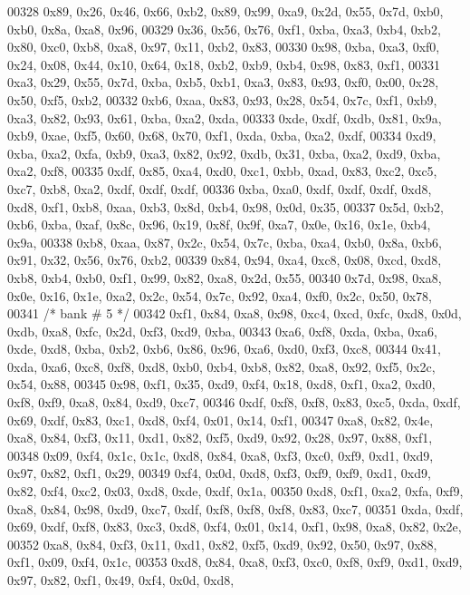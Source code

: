 \begin{DoxyCode}
00328     0x89, 0x26, 0x46, 0x66, 0xb2, 0x89, 0x99, 0xa9, 0x2d, 0x55, 0x7d, 0xb0, 0xb0, 0x8a, 0xa8, 0x96,
00329     0x36, 0x56, 0x76, 0xf1, 0xba, 0xa3, 0xb4, 0xb2, 0x80, 0xc0, 0xb8, 0xa8, 0x97, 0x11, 0xb2, 0x83,
00330     0x98, 0xba, 0xa3, 0xf0, 0x24, 0x08, 0x44, 0x10, 0x64, 0x18, 0xb2, 0xb9, 0xb4, 0x98, 0x83, 0xf1,
00331     0xa3, 0x29, 0x55, 0x7d, 0xba, 0xb5, 0xb1, 0xa3, 0x83, 0x93, 0xf0, 0x00, 0x28, 0x50, 0xf5, 0xb2,
00332     0xb6, 0xaa, 0x83, 0x93, 0x28, 0x54, 0x7c, 0xf1, 0xb9, 0xa3, 0x82, 0x93, 0x61, 0xba, 0xa2, 0xda,
00333     0xde, 0xdf, 0xdb, 0x81, 0x9a, 0xb9, 0xae, 0xf5, 0x60, 0x68, 0x70, 0xf1, 0xda, 0xba, 0xa2, 0xdf,
00334     0xd9, 0xba, 0xa2, 0xfa, 0xb9, 0xa3, 0x82, 0x92, 0xdb, 0x31, 0xba, 0xa2, 0xd9, 0xba, 0xa2, 0xf8,
00335     0xdf, 0x85, 0xa4, 0xd0, 0xc1, 0xbb, 0xad, 0x83, 0xc2, 0xc5, 0xc7, 0xb8, 0xa2, 0xdf, 0xdf, 0xdf,
00336     0xba, 0xa0, 0xdf, 0xdf, 0xdf, 0xd8, 0xd8, 0xf1, 0xb8, 0xaa, 0xb3, 0x8d, 0xb4, 0x98, 0x0d, 0x35,
00337     0x5d, 0xb2, 0xb6, 0xba, 0xaf, 0x8c, 0x96, 0x19, 0x8f, 0x9f, 0xa7, 0x0e, 0x16, 0x1e, 0xb4, 0x9a,
00338     0xb8, 0xaa, 0x87, 0x2c, 0x54, 0x7c, 0xba, 0xa4, 0xb0, 0x8a, 0xb6, 0x91, 0x32, 0x56, 0x76, 0xb2,
00339     0x84, 0x94, 0xa4, 0xc8, 0x08, 0xcd, 0xd8, 0xb8, 0xb4, 0xb0, 0xf1, 0x99, 0x82, 0xa8, 0x2d, 0x55,
00340     0x7d, 0x98, 0xa8, 0x0e, 0x16, 0x1e, 0xa2, 0x2c, 0x54, 0x7c, 0x92, 0xa4, 0xf0, 0x2c, 0x50, 0x78,
00341     \textcolor{comment}{/* bank # 5 */}
00342     0xf1, 0x84, 0xa8, 0x98, 0xc4, 0xcd, 0xfc, 0xd8, 0x0d, 0xdb, 0xa8, 0xfc, 0x2d, 0xf3, 0xd9, 0xba,
00343     0xa6, 0xf8, 0xda, 0xba, 0xa6, 0xde, 0xd8, 0xba, 0xb2, 0xb6, 0x86, 0x96, 0xa6, 0xd0, 0xf3, 0xc8,
00344     0x41, 0xda, 0xa6, 0xc8, 0xf8, 0xd8, 0xb0, 0xb4, 0xb8, 0x82, 0xa8, 0x92, 0xf5, 0x2c, 0x54, 0x88,
00345     0x98, 0xf1, 0x35, 0xd9, 0xf4, 0x18, 0xd8, 0xf1, 0xa2, 0xd0, 0xf8, 0xf9, 0xa8, 0x84, 0xd9, 0xc7,
00346     0xdf, 0xf8, 0xf8, 0x83, 0xc5, 0xda, 0xdf, 0x69, 0xdf, 0x83, 0xc1, 0xd8, 0xf4, 0x01, 0x14, 0xf1,
00347     0xa8, 0x82, 0x4e, 0xa8, 0x84, 0xf3, 0x11, 0xd1, 0x82, 0xf5, 0xd9, 0x92, 0x28, 0x97, 0x88, 0xf1,
00348     0x09, 0xf4, 0x1c, 0x1c, 0xd8, 0x84, 0xa8, 0xf3, 0xc0, 0xf9, 0xd1, 0xd9, 0x97, 0x82, 0xf1, 0x29,
00349     0xf4, 0x0d, 0xd8, 0xf3, 0xf9, 0xf9, 0xd1, 0xd9, 0x82, 0xf4, 0xc2, 0x03, 0xd8, 0xde, 0xdf, 0x1a,
00350     0xd8, 0xf1, 0xa2, 0xfa, 0xf9, 0xa8, 0x84, 0x98, 0xd9, 0xc7, 0xdf, 0xf8, 0xf8, 0xf8, 0x83, 0xc7,
00351     0xda, 0xdf, 0x69, 0xdf, 0xf8, 0x83, 0xc3, 0xd8, 0xf4, 0x01, 0x14, 0xf1, 0x98, 0xa8, 0x82, 0x2e,
00352     0xa8, 0x84, 0xf3, 0x11, 0xd1, 0x82, 0xf5, 0xd9, 0x92, 0x50, 0x97, 0x88, 0xf1, 0x09, 0xf4, 0x1c,
00353     0xd8, 0x84, 0xa8, 0xf3, 0xc0, 0xf8, 0xf9, 0xd1, 0xd9, 0x97, 0x82, 0xf1, 0x49, 0xf4, 0x0d, 0xd8,

\end{DoxyCode}

